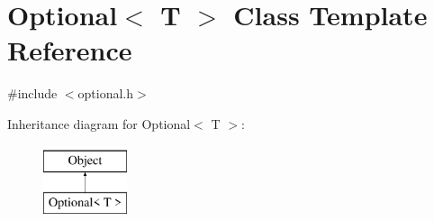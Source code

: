 \hypertarget{classOptional}{}\section{Optional$<$ T $>$ Class Template Reference}
\label{classOptional}


{\ttfamily \#include $<$optional.\+h$>$}

Inheritance diagram for Optional$<$ T $>$\+:\begin{figure}[H]
\begin{center}
\leavevmode
\includegraphics[height=2.000000cm]{classOptional}
\end{center}
\end{figure}
